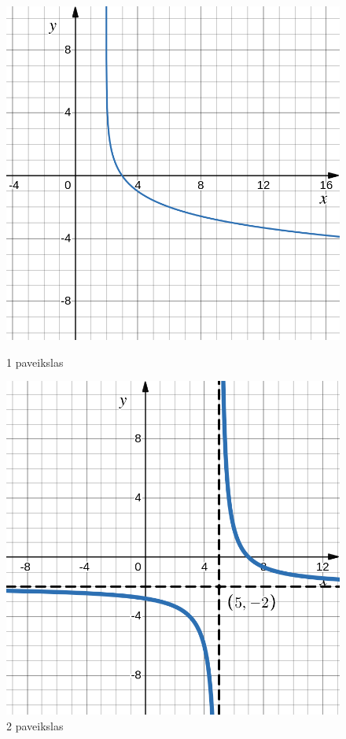 \documentclass[a4paper]{article}
\begin{document}
\begin{enumerate}
\begin{figure}[!htpb]
\begin{minipage}[]{0.5\linewidth}
                        \includegraphics[width=.85\linewidth]{images/func_1.png}
                        \captionsetup{labelformat=empty}
                        \caption{1 paveikslas}
                        \label{fig:test1}
                  \end{minipage}%
                  \begin{minipage}{.5\textwidth}
                        \centering

                        \includegraphics[width=.85\linewidth]{images/func_2.png}
                        \captionsetup{labelformat=empty}
                        \caption{2 paveikslas}
                        \label{fig:test2}
                  \end{minipage}
            \end{figure}
\end{enumerate}
\end{document}
